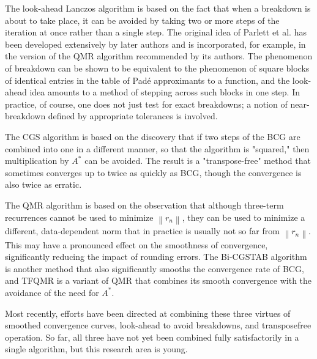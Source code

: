The look-ahead Lanczos algorithm is based on the fact that when a breakdown is about to take place, it can be avoided by taking two or more steps of the iteration at once rather than a single step. The original idea of Parlett et al. has been developed extensively by later authors and is incorporated, for example, in the version of the QMR algorithm recommended by its authors. The phenomenon of breakdown can be shown to be equivalent to the phenomenon of square blocks of identical entries in the table of Padé approximants to a function, and the look-ahead idea amounts to a method of stepping across such blocks in one step. In practice, of course, one does not just test for exact breakdowns; a notion of near-breakdown defined by appropriate tolerances is involved.

The CGS algorithm is based on the discovery that if two steps of the BCG are combined into one in a different manner, so that the algorithm is "squared," then multiplication by $A^*$ can be avoided. The result is a "transpose-free" method that sometimes converges up to twice as quickly as BCG, though the convergence is also twice as erratic.

The QMR algorithm is based on the observation that although three-term recurrences cannot be used to minimize $\left\|r_n\right\|$, they can be used to minimize a different, data-dependent norm that in practice is usually not so far from $\left\|r_n\right\|$. This may have a pronounced effect on the smoothness of convergence, significantly reducing the impact of rounding errors. The Bi-CGSTAB algorithm is another method that also significantly smooths the convergence rate of BCG, and TFQMR is a variant of QMR that combines its smooth convergence with the avoidance of the need for $A^*$.

Most recently, efforts have been directed at combining these three virtues of smoothed convergence curves, look-ahead to avoid breakdowns, and transposefree operation. So far, all three have not yet been combined fully satisfactorily in a single algorithm, but this research area is young.